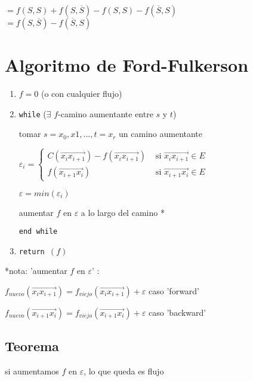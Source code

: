\documentclass[12pt]{article}
\begin{document}
\(= f(S,S) + f(S, \overline{S}) - f(S, S) - f(\overline{S}, S)\)\\

\(= f(S, \overline{S}) - f(\overline{S}, S)\)

\section*{Algoritmo de Ford-Fulkerson}
\begin{enumerate}
\item \(f = 0\) (o con cualquier flujo)
\item \texttt{while} ($\exists$ $f$-camino aumentante entre $s$ y $t$)

\hspace{3em} tomar $s = x_0, x1, ..., t = x_r$ un camino aumentante

\hspace{3em} 
\(\varepsilon_i =
\begin{cases}
C(\overrightarrow{x_{i}x_{i+1}}) - f(\overrightarrow{x_{i}x_{i+1}}) & \text{ si } \overrightarrow{x_{i}x_{i+1}} \in E \\
f(\overrightarrow{x_{i+1}x_i}) & \text{ si } \overrightarrow{x_{i+1}x_i} \in E
\end{cases} 
\)

\hspace{3em} \(\varepsilon = min(\varepsilon_i)\)

\hspace{3em} aumentar $f$ en $\varepsilon$ a lo largo del camino *

\texttt{end while}

\item \texttt{return \((f)\)}
\end{enumerate}

*nota: 'aumentar $f$ en $\varepsilon$' : 

$f_{nuevo}(\overrightarrow{x_ix_{i+1}}) = f_{viejo}(\overrightarrow{x_ix_{i+1}}) + \varepsilon$ caso 'forward'

$f_{nuevo}(\overrightarrow{x_{i+1}x_{i}}) = f_{viejo}(\overrightarrow{x_{i+1}x_{i}}) + \varepsilon$ caso 'backward'

\begin{center}
\section*{Teorema}
si aumentamos $f$ en $\varepsilon$, lo que queda es flujo
\end{center}
\end{document}
